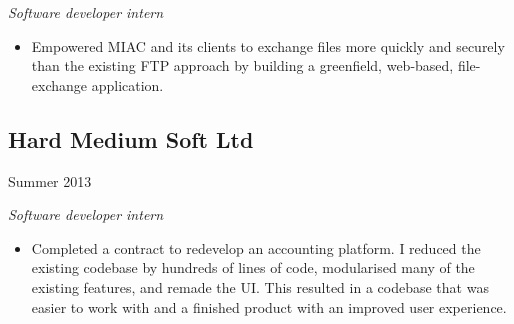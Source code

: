 \emph{Software developer intern}

\begin{itemize}
\item Empowered MIAC and its clients to exchange files more quickly and
  securely than the existing FTP approach by building a greenfield, web-based,
  file-exchange application.
\end{itemize}

\noindent\begin{minipage}[t]{0.5\textwidth}
  \subsection*{Hard Medium Soft Ltd}
\end{minipage}
\noindent\begin{minipage}[t]{0.5\textwidth}
  \flushright
  Summer 2013
\end{minipage}

\emph{Software developer intern}

\begin{itemize}
\item Completed a contract to redevelop an accounting platform. I reduced the
  existing codebase by hundreds of lines of code, modularised many of the
  existing features, and remade the UI. This resulted in a codebase that was
  easier to work with and a finished product with an improved user experience.
\end{itemize}


